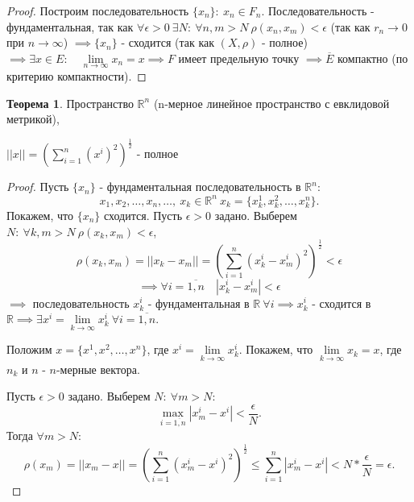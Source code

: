 \documentclass{report}
\theoremstyle{definition}
\newtheorem{theorem}{Теорема}[section]
\begin{document}
\begin{proof}
  Построим последовательность $\{x_n\}: \ x_n \in F_n$. Последовательность - фундаментальная, так как
  $\forall \epsilon > 0 \ \exists N : \ \forall n,m > N \ \rho(x_n,x_m) < \epsilon$ (так как $r_n\rightarrow0$
  при $n\rightarrow \infty$) $\implies \{x_n\}$ - сходится (так как $(X,\rho)$ - полное) $\implies \exists x \in E:
    \quad \underset{n \rightarrow \infty}{\lim} x_n = x \implies F$ имеет предельную точку $\implies \overline{E}$
  компактно (по критерию компактности).
\end{proof}

\begin{theorem}
  Пространство $\mathbb{R}^n$ (n-мерное линейное пространство с евклидовой метрикой),
  \begin{center}
    $||x|| = (\sum_{i=1}^{n} (x^i)^2)^\frac{1}{2}$ - полное
  \end{center}
\end{theorem}

\begin{proof}
  Пусть $\{x_n\}$ - фундаментальная последовательность в $\mathbb{R}^n$:
  \begin{equation*}
    x_1,x_2,\ldots,x_n,\ldots, \ x_k \in \mathbb{R}^n \ x_k = \{x_k^1,x_k^2,\ldots,x_k^n\}.
  \end{equation*}
  Покажем, что $\{x_n\}$ сходится. Пусть $\epsilon > 0$ задано. Выберем $N: \ \forall k,m > N \ \rho(x_k,x_m) <
    \epsilon$,
  \begin{equation*}
    \rho(x_k,x_m) = ||x_k-x_m|| = (\sum_{i=1}^{n}(x_k^i - x_m^i)^2)^\frac{1}{2} < \epsilon
  \end{equation*}
  \begin{equation*}
    \implies \forall i = \overline{1,n} \quad |x_k^i - x_m^i| < \epsilon
  \end{equation*}
  $\implies$ последовательность $x_k^i$ - фундаментальная в $\mathbb{R} \ \forall i \implies x_k^i$ - сходится
  в $\mathbb{R} \implies \exists x^i = \underset{k\rightarrow \infty}{\lim} x^i_k \ \forall i = \overline{1,n}$.

  Положим $x = \{x^1,x^2,\ldots,x^n\}$, где $x^i = \underset{k\rightarrow\infty}{\lim} x_k^i$.
  Покажем, что $\underset{k\rightarrow\infty}{\lim} x_k = x$, где $n_k$ и $n$ - $n$-мерные вектора.

  Пусть $\epsilon > 0$ задано. Выберем $N: \ \forall m > N$:
  \begin{equation*}
    \underset{i = \overline{1,n}}{\max} |x_m^i - x^i| < \frac{\epsilon}{N}.
  \end{equation*}
  Тогда $\forall m > N$:
  \begin{equation*}
    \rho(x_m) = ||x_m - x|| = (\sum_{i=1}^{n}(x_m^i - x^i)^2)^\frac{1}{2} \leqslant \sum_{i=1}^{n}|x_m^i - x^i| <
    N * \frac{\epsilon}{N} = \epsilon.
  \end{equation*}
\end{proof}
\end{document}
